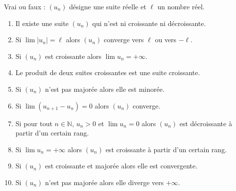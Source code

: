 \documentclass[]{exercices}
\begin{document}
\begin{exercice}
	Vrai ou faux : $(u_n)$ désigne une suite réelle et $\ell$ un nombre réel.
	\begin{enumerate}
		\item Il existe une suite $(u_n)$ qui n'est ni croissante ni décroissante.
		\item Si $\lim |u_n|=\ell$ alors $(u_n)$ converge vers $\ell$ ou vers $-\ell$.
		\item Si $(u_n)$ est croissante alors $\lim u_n=+\infty$.
		\item Le produit de deux suites croissantes est une suite croissante.
		\item Si $(u_n)$ n'est pas majorée alors elle est minorée.
		\item Si $\lim (u_{n+1}-u_{n})=0$ alors $(u_n)$ converge.
		\item Si pour tout $n\in\mathbb{N}$, $u_n>0$ et $\lim u_n=0$ alors $(u_n)$ est décroissante à partir d'un certain rang.
		\item Si $\lim u_n=+\infty$ alors $(u_n)$ est croissante à partir d'un certain rang.
		\item Si $(u_n)$ est croissante et majorée alors elle est convergente.
		\item Si $(u_n)$ n'est pas majorée alors elle diverge vers $+\infty$.
	\end{enumerate}
\end{exercice}
\end{document}
